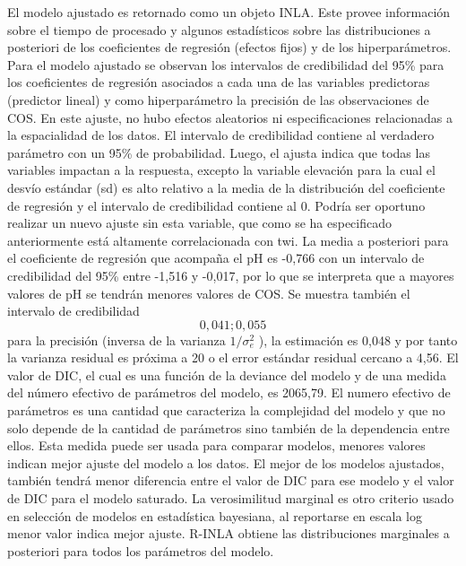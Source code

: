 \documentclass[11pt,b5paper,]{krantz}
\begin{document}
El modelo ajustado es retornado como un objeto INLA. Este provee información sobre el tiempo de procesado y algunos estadísticos sobre las distribuciones a posteriori de los coeficientes de regresión (efectos fijos) y de los hiperparámetros. Para el modelo ajustado se observan los intervalos de credibilidad del 95\% para los coeficientes de regresión asociados a cada una de las variables predictoras (predictor lineal) y como hiperparámetro la precisión de las observaciones de COS. En este ajuste, no hubo efectos aleatorios ni especificaciones relacionadas a la espacialidad de los datos.
El intervalo de credibilidad contiene al verdadero parámetro con un 95\% de probabilidad. Luego, el ajusta indica que todas las variables impactan a la respuesta, excepto la variable elevación para la cual el desvío estándar (sd) es alto relativo a la media de la distribución del coeficiente de regresión y el intervalo de credibilidad contiene al 0. Podría ser oportuno realizar un nuevo ajuste sin esta variable, que como se ha especificado anteriormente está altamente correlacionada con twi. La media a posteriori para el coeficiente de regresión que acompaña el pH es -0,766 con un intervalo de credibilidad del 95\% entre -1,516 y -0,017, por lo que se interpreta que a mayores valores de pH se tendrán menores valores de COS. Se muestra también el intervalo de credibilidad \[0,041; 0,055\] para la precisión (inversa de la varianza \(1/\sigma_e^2\) ), la estimación es 0,048 y por tanto la varianza residual es próxima a 20 o el error estándar residual cercano a 4,56. El valor de DIC, el cual es una función de la deviance del modelo y de una medida del número efectivo de parámetros del modelo, es 2065,79. El numero efectivo de parámetros es una cantidad que caracteriza la complejidad del modelo y que no solo depende de la cantidad de parámetros sino también de la dependencia entre ellos. Esta medida puede ser usada para comparar modelos, menores valores indican mejor ajuste del modelo a los datos. El mejor de los modelos ajustados, también tendrá menor diferencia entre el valor de DIC para ese modelo y el valor de DIC para el modelo saturado. La verosimilitud marginal es otro criterio usado en selección de modelos en estadística bayesiana, al reportarse en escala log menor valor indica mejor ajuste. R-INLA obtiene las distribuciones marginales a posteriori para todos los parámetros del modelo.
\end{document}
